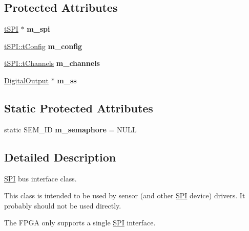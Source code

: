 \subsection*{Protected Attributes}
\begin{DoxyCompactItemize}
\item 
\hypertarget{classSPI_a2e51fd2a5f60a207e1948fcce6ce4b6a}{
\hyperlink{classnFPGA_1_1nFRC__2012__1__6__4_1_1tSPI}{tSPI} $\ast$ {\bfseries m\_\-spi}}
\label{classSPI_a2e51fd2a5f60a207e1948fcce6ce4b6a}

\item 
\hypertarget{classSPI_a246566dd89a56e47235573fa1cbf4650}{
\hyperlink{unionnFPGA_1_1nFRC__2012__1__6__4_1_1tSPI_1_1tConfig}{tSPI::tConfig} {\bfseries m\_\-config}}
\label{classSPI_a246566dd89a56e47235573fa1cbf4650}

\item 
\hypertarget{classSPI_a400f5597cc5fa5d5ec4e53b16e7e563a}{
\hyperlink{unionnFPGA_1_1nFRC__2012__1__6__4_1_1tSPI_1_1tChannels}{tSPI::tChannels} {\bfseries m\_\-channels}}
\label{classSPI_a400f5597cc5fa5d5ec4e53b16e7e563a}

\item 
\hypertarget{classSPI_abb5b7fdb1d7bd262f01f1955611dad04}{
\hyperlink{classDigitalOutput}{DigitalOutput} $\ast$ {\bfseries m\_\-ss}}
\label{classSPI_abb5b7fdb1d7bd262f01f1955611dad04}

\end{DoxyCompactItemize}
\subsection*{Static Protected Attributes}
\begin{DoxyCompactItemize}
\item 
\hypertarget{classSPI_a5526fc62f7ed652c65ab9e4a5f778062}{
static SEM\_\-ID {\bfseries m\_\-semaphore} = NULL}
\label{classSPI_a5526fc62f7ed652c65ab9e4a5f778062}

\end{DoxyCompactItemize}


\subsection{Detailed Description}
\hyperlink{classSPI}{SPI} bus interface class.

This class is intended to be used by sensor (and other \hyperlink{classSPI}{SPI} device) drivers. It probably should not be used directly.

The FPGA only supports a single \hyperlink{classSPI}{SPI} interface. 

